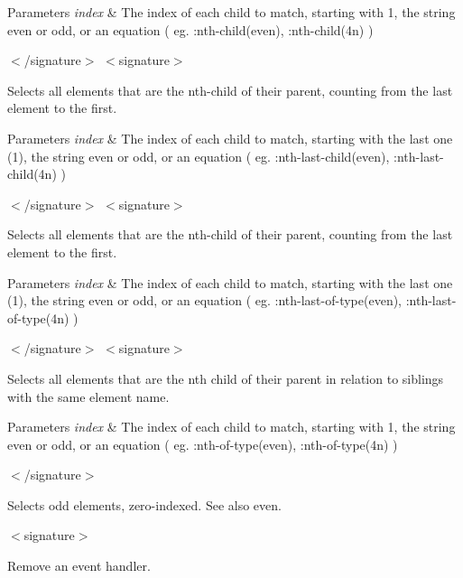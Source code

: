 \begin{DoxyParams}{Parameters}
{\em index} & The index of each child to match, starting with 1, the string even or odd, or an equation ( eg. \+:nth-\/child(even), \+:nth-\/child(4n) )\\
\hline
\end{DoxyParams}
$<$/signature$>$ $<$signature$>$ 

Selects all elements that are the nth-\/child of their parent, counting from the last element to the first.


\begin{DoxyParams}{Parameters}
{\em index} & The index of each child to match, starting with the last one (1), the string even or odd, or an equation ( eg. \+:nth-\/last-\/child(even), \+:nth-\/last-\/child(4n) )\\
\hline
\end{DoxyParams}
$<$/signature$>$ $<$signature$>$ 

Selects all elements that are the nth-\/child of their parent, counting from the last element to the first.


\begin{DoxyParams}{Parameters}
{\em index} & The index of each child to match, starting with the last one (1), the string even or odd, or an equation ( eg. \+:nth-\/last-\/of-\/type(even), \+:nth-\/last-\/of-\/type(4n) )\\
\hline
\end{DoxyParams}
$<$/signature$>$ $<$signature$>$ 

Selects all elements that are the nth child of their parent in relation to siblings with the same element name.


\begin{DoxyParams}{Parameters}
{\em index} & The index of each child to match, starting with 1, the string even or odd, or an equation ( eg. \+:nth-\/of-\/type(even), \+:nth-\/of-\/type(4n) )\\
\hline
\end{DoxyParams}
$<$/signature$>$ 

Selects odd elements, zero-\/indexed. See also even.

$<$signature$>$ 

Remove an event handler.



